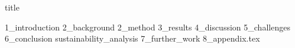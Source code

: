 \documentclass{article}
\begin{document}
{title}

\frontmatter

\tableofcontents


\mainmatter


{1_introduction}
{2_background}
{2_method}
{3_results}
{4_discussion}
{5_challenges}
{6_conclusion}
{sustainability_analysis}
{7_further_work}
{8_appendix.tex}
\newpage



\end{document}
